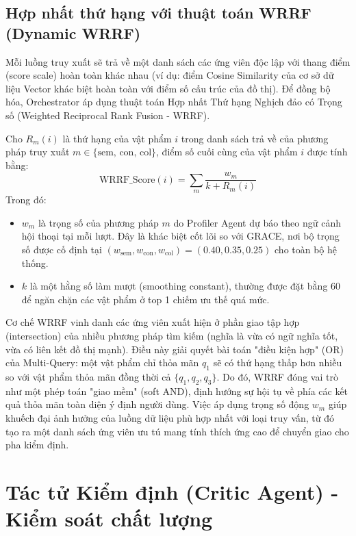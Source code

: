 \subsection{Hợp nhất thứ hạng với thuật toán WRRF (Dynamic WRRF)}
Mỗi luồng truy xuất sẽ trả về một danh sách các ứng viên độc lập với thang điểm (score scale) hoàn toàn khác nhau (ví dụ: điểm Cosine Similarity của cơ sở dữ liệu Vector khác biệt hoàn toàn với điểm số cấu trúc của đồ thị). Để đồng bộ hóa, Orchestrator áp dụng thuật toán Hợp nhất Thứ hạng Nghịch đảo có Trọng số (Weighted Reciprocal Rank Fusion - WRRF).

Cho $R_m(i)$ là thứ hạng của vật phẩm $i$ trong danh sách trả về của phương pháp truy xuất $m \in \{\text{sem, con, col}\}$, điểm số cuối cùng của vật phẩm $i$ được tính bằng:
\begin{equation}
    \text{WRRF\_Score}(i) = \sum_{m} \frac{w_m}{k + R_m(i)}
\end{equation}
Trong đó:
\begin{itemize}
    \item $w_m$ là trọng số của phương pháp $m$ do Profiler Agent dự báo theo ngữ cảnh hội thoại tại mỗi lượt. Đây là khác biệt cốt lõi so với GRACE, nơi bộ trọng số được cố định tại $(w_{\text{sem}}, w_{\text{con}}, w_{\text{col}}) = (0.40, 0.35, 0.25)$ cho toàn bộ hệ thống.
    \item $k$ là một hằng số làm mượt (smoothing constant), thường được đặt bằng 60 để ngăn chặn các vật phẩm ở top 1 chiếm ưu thế quá mức.
\end{itemize}
Cơ chế WRRF vinh danh các ứng viên xuất hiện ở phần giao tập hợp (intersection) của nhiều phương pháp tìm kiếm (nghĩa là vừa có ngữ nghĩa tốt, vừa có liên kết đồ thị mạnh). Điều này giải quyết bài toán "điều kiện hợp" (OR) của Multi-Query: một vật phẩm chỉ thỏa mãn $q_1$ sẽ có thứ hạng thấp hơn nhiều so với vật phẩm thỏa mãn đồng thời cả $\{q_1, q_2, q_3\}$. Do đó, WRRF đóng vai trò như một phép toán "giao mềm" (soft AND), định hướng sự hội tụ về phía các kết quả thỏa mãn toàn diện ý định người dùng. Việc áp dụng trọng số động $w_m$ giúp khuếch đại ảnh hưởng của luồng dữ liệu phù hợp nhất với loại truy vấn, từ đó tạo ra một danh sách ứng viên ưu tú mang tính thích ứng cao để chuyển giao cho pha kiểm định.

\section{Tác tử Kiểm định (Critic Agent) - Kiểm soát chất lượng}

